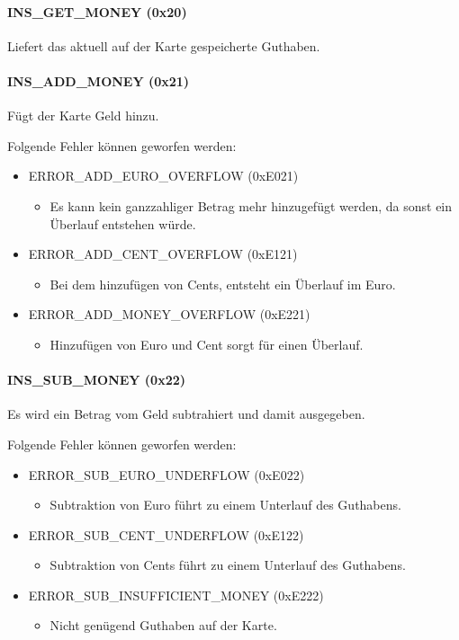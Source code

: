 \paragraph{INS\_GET\_MONEY (0x20)}
Liefert das aktuell auf der Karte gespeicherte Guthaben.
\paragraph{INS\_ADD\_MONEY (0x21)}
Fügt der Karte Geld hinzu.

Folgende Fehler können geworfen werden:
\begin{itemize}
	\item ERROR\_ADD\_EURO\_OVERFLOW (0xE021)
	\begin{itemize}
		\item Es kann kein ganzzahliger Betrag mehr hinzugefügt werden, da sonst ein Überlauf entstehen würde.
	\end{itemize}
	\item ERROR\_ADD\_CENT\_OVERFLOW (0xE121)
	\begin{itemize}
		\item Bei dem hinzufügen von Cents, entsteht ein Überlauf im Euro. 
	\end{itemize}
	\item ERROR\_ADD\_MONEY\_OVERFLOW (0xE221)
	\begin{itemize}
		\item Hinzufügen von Euro und Cent sorgt für einen Überlauf.
	\end{itemize}
\end{itemize}

\paragraph{INS\_SUB\_MONEY (0x22)}
Es wird ein Betrag vom Geld subtrahiert und damit ausgegeben.

Folgende Fehler können geworfen werden:
 \begin{itemize}
 	\item ERROR\_SUB\_EURO\_UNDERFLOW (0xE022)
 	\begin{itemize}
 		\item Subtraktion von Euro führt zu einem Unterlauf des Guthabens.
 	\end{itemize}
 	 \item ERROR\_SUB\_CENT\_UNDERFLOW (0xE122)
 	\begin{itemize}
 		\item Subtraktion von Cents führt zu einem Unterlauf des Guthabens.
 	\end{itemize}
 	 \item ERROR\_SUB\_INSUFFICIENT\_MONEY (0xE222)
 	\begin{itemize}
 		\item Nicht genügend Guthaben auf der Karte.
 	\end{itemize}
 \end{itemize}
 
